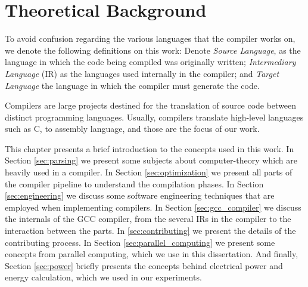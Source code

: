\chapter{Theoretical Background}
\label{chap:fundamentacao}

To avoid confusion regarding the various languages that the compiler works on,
we denote the following definitions on this work: Denote \textit{Source
Language}, as the language in which the code being compiled was originally
written; \textit{Intermediary Language} (IR) as the languages used internally in the
compiler; and \textit{Target Language} the language in which the compiler must
generate the code.

Compilers are large projects destined for the translation of source code
between distinct programming languages. Usually, compilers translate high-level
languages such as C, to assembly language, and those are the focus of our work.

This chapter presents a brief introduction to the concepts used in this work.
In Section \ref{sec:parsing} we present some subjects about computer-theory
which are heavily used in a compiler. In Section \ref{sec:optimization} we
present all parts of the compiler pipeline to understand the compilation
phases. In Section \ref{sec:engineering} we discuss some software engineering
techniques that are employed when implementing compilers.  In Section
\ref{sec:gcc_compiler} we discuss the internals of the GCC compiler, from the
several IRs in the compiler to the interaction between the parts.  In
\ref{sec:contributing} we present the details of the contributing process. In
Section \ref{sec:parallel_computing} we present some concepts from parallel
computing, which we use in this dissertation. And finally, Section
\ref{sec:power} briefly presents the concepts behind electrical power and energy
calculation, which we used in our experiments.




